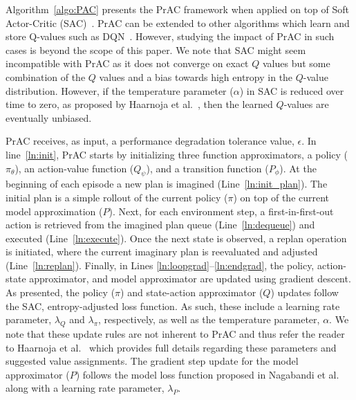 \documentclass[letterpaper]{article} %
\begin{document}
Algorithm~\ref{algo:PAC} presents the PrAC framework when applied on top of Soft Actor-Critic (SAC)~\cite{haarnoja2018soft}. PrAC can be extended to other algorithms which learn and store Q-values such as DQN~\cite{mnih2015human}. However, studying the impact of PrAC in such cases is beyond the scope of this paper. We note that SAC might seem incompatible with PrAC as it does not converge on exact $Q$ values but some combination of the $Q$ values and a bias towards high entropy in the $Q$-value distribution. However, if the temperature parameter ($\alpha$) in SAC is reduced over time to zero, as proposed by Haarnoja et al.~\citeyear{haarnoja2018soft}, then the learned $Q$-values are eventually unbiased.  

PrAC receives, as input, a performance degradation tolerance value, $\epsilon$. In line~\ref{ln:init}, PrAC starts by initializing three function approximators, a policy ($\pi_\theta$), an action-value function ($Q_\psi$), and a transition function ($P_\phi$).  
At the beginning of each episode a new plan is imagined (Line~\ref{ln:init_plan}). The initial plan is a simple rollout of the current policy ($\pi$) on top of the current model approximation ($P$). Next, for each environment step, a first-in-first-out action is retrieved from the imagined plan queue (Line~\ref{ln:dequeue}) and executed (Line~\ref{ln:execute}). Once the next state is observed, a replan operation is initiated, where the current imaginary plan is reevaluated and adjusted (Line~\ref{ln:replan}). Finally, in Lines \ref{ln:loopgrad}--\ref{ln:endgrad}, the policy, action-state approximator, and model approximator are updated using gradient descent. As presented, the policy ($\pi$) and state-action approximator ($Q$) updates follow the SAC, entropy-adjusted loss function. As such, these include a learning rate parameter, $\lambda_Q$ and $\lambda_\pi$, respectively, as well as the temperature parameter, $\alpha$. We note that these update rules are not inherent to PrAC and thus refer the reader to Haarnoja et al.~\citeyear{haarnoja2018soft} which provides full details regarding these parameters and suggested value assignments.
The gradient step update for the model approximator ($P$) follows the model loss function proposed in Nagabandi et al.~\citeyear{nagabandi2018neural} along with a learning rate parameter, $\lambda_P$.    %
\end{document}
